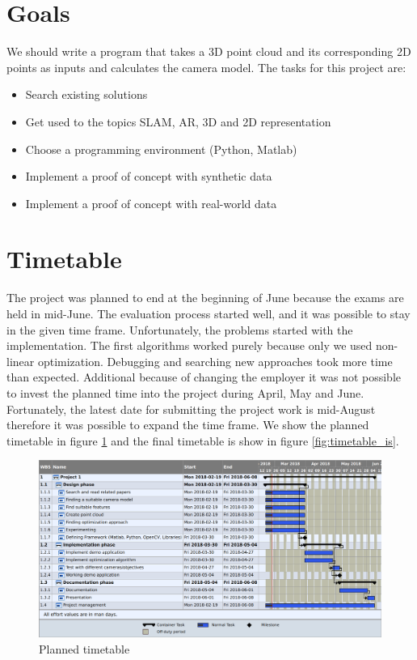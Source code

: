 \documentclass[11pt,a4paper,titlepage,oneside]{report}
\begin{document}
\section{Goals}
We should write a program that takes a 3D point cloud and its corresponding 2D points as inputs and calculates the camera model. The tasks for this project are:
\begin{itemize}
\item Search existing solutions
\item Get used to the topics SLAM, AR, 3D and 2D representation
\item Choose a programming environment (Python, Matlab)
\item Implement a proof of concept with synthetic data
\item Implement a proof of concept with real-world data
\end{itemize}

\section{Timetable}

The project was planned to end at the beginning of June because the exams are held in mid-June. The evaluation process started well, and it was possible to stay in the given time frame. Unfortunately, the problems started with the implementation. The first algorithms worked purely because only we used non-linear optimization. Debugging and searching new approaches took more time than expected. Additional because of changing the employer it was not possible to invest the planned time into the project during April, May and June. Fortunately, the latest date for submitting the project work is mid-August therefore it was possible to expand the time frame. We show the planned timetable in figure \ref{fig:timetable_should} and the final timetable is show in figure \ref{fig:timetable_is}.
\begin{figure}[H]
	\includegraphics[width=1.0\textwidth]{img/timetable_should.png}
	\caption{Planned timetable}\label{fig:timetable_should}
\end{figure}
\end{document}
